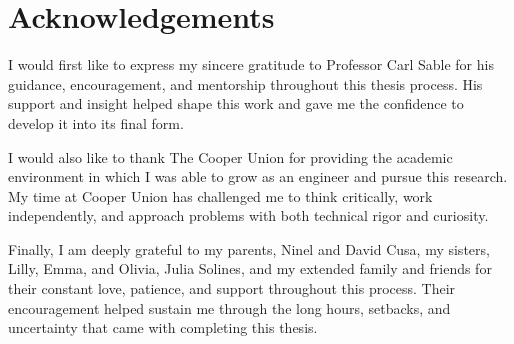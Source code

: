 \section*{Acknowledgements}

I would first like to express my sincere gratitude to Professor Carl Sable for 
his guidance, encouragement, and mentorship throughout this thesis process. His 
support and insight helped shape this work and gave me the confidence to develop 
it into its final form.

I would also like to thank The Cooper Union for providing the academic environment
in which I was able to grow as an engineer and pursue this research. My time at 
Cooper Union has challenged me to think critically, work independently, and approach
problems with both technical rigor and curiosity.

Finally, I am deeply grateful to my parents, Ninel and David Cusa, my sisters, Lilly, Emma, and Olivia,
Julia Solines, and my extended family and friends for their constant love, patience, and support
throughout this process. Their encouragement helped sustain me through the long 
hours, setbacks, and uncertainty that came with completing this thesis.
